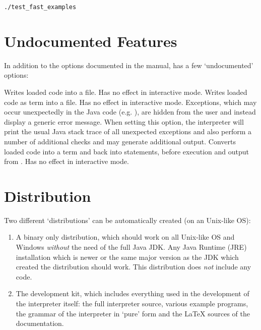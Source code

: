 \begin{lstlisting}[frame=none,numbers=none]
./test_fast_examples
\end{lstlisting}

\section{Undocumented Features}

In addition to the options documented in the manual, \setlX{} has a few `undocumented' options:

\begin{itemize}
          {Writes loaded code into a file. Has no effect in interactive mode.}
          {Writes loaded code as term into a file. Has no effect in interactive mode.}
          {Exceptions, which may occur unexpectedly in the Java code (e.g. ), are hidden from the user and instead display a generic error message.
        When setting this option, the interpreter will print the usual Java stack trace of all unexpected exceptions and also perform a number of additional checks and may generate additional output.}
          {Converts loaded code into a term and back into statements, before execution and output from .  Has no effect in interactive mode.}
\end{itemize}

\section{Distribution}

Two different `distributions' can be automatically created (on an Unix-like OS):

\begin{enumerate}
    \item A binary only distribution, which should work on all Unix-like OS and Windows \emph{without} the need of the full Java JDK.
        Any Java Runtime (JRE) installation which is newer or the same major version as the JDK which created the distribution should work.
        This distribution does \emph{not} include any \SetlX{} code.

    \item The development kit, which includes everything used in the development of the interpreter itself: the full interpreter source, various \SetlX{} example programs, the grammar of the interpreter in `pure' form and the \LaTeX{} sources of the documentation.
\end{enumerate}

